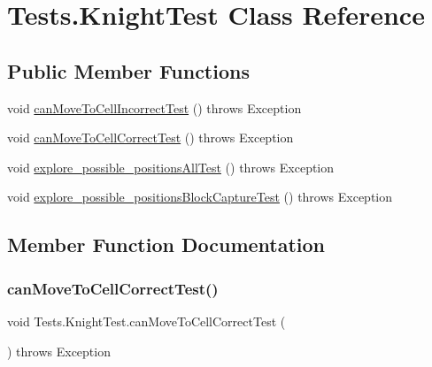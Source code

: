 \hypertarget{class_tests_1_1_knight_test}{}\section{Tests.\+Knight\+Test Class Reference}
\label{class_tests_1_1_knight_test}
\subsection*{Public Member Functions}
\begin{DoxyCompactItemize}
\item 
void \hyperlink{class_tests_1_1_knight_test_a2a0d937a0083e7713c0dd50c7dac26de}{can\+Move\+To\+Cell\+Incorrect\+Test} ()  throws Exception 
\item 
void \hyperlink{class_tests_1_1_knight_test_a4ba3c282719c171123c4befad34ff86a}{can\+Move\+To\+Cell\+Correct\+Test} ()  throws Exception 
\item 
void \hyperlink{class_tests_1_1_knight_test_a870d8cf9b905eafc3f24d34c2e83b163}{explore\+\_\+possible\+\_\+positions\+All\+Test} ()  throws Exception 
\item 
void \hyperlink{class_tests_1_1_knight_test_ab48152da0c4686a6baadc268e313ca54}{explore\+\_\+possible\+\_\+positions\+Block\+Capture\+Test} ()  throws Exception 
\end{DoxyCompactItemize}


\subsection{Member Function Documentation}
\mbox{\label{class_tests_1_1_knight_test_a4ba3c282719c171123c4befad34ff86a}} 
\subsubsection{\texorpdfstring{can\+Move\+To\+Cell\+Correct\+Test()}{canMoveToCellCorrectTest()}}
{\footnotesize\ttfamily void Tests.\+Knight\+Test.\+can\+Move\+To\+Cell\+Correct\+Test (\begin{DoxyParamCaption}{ }\end{DoxyParamCaption}) throws Exception\hspace{0.3cm}{\ttfamily [inline]}}

